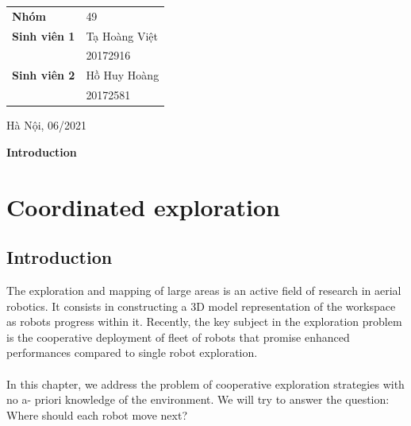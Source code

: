 \documentclass[11pt,openany]{book}
\begin{document}
\begin{titlepage}
\begin{center}
        \vspace{1cm}
        \Large
        \begin{center}
            \begin{tabular}{ l l }
                \textbf{Nhóm}        & 49            \\
                \textbf{Sinh viên 1} & Tạ Hoàng Việt \\
                                     & 20172916      \\
                \textbf{Sinh viên 2} & Hồ Huy Hoàng  \\
                                     & 20172581
            \end{tabular}
        \end{center}
        \vspace{1cm}
        \normalsize
        Hà Nội, 06/2021
    \end{center}
\end{titlepage}
\tableofcontents
\listoffigures
\listoftables
\newpage
\thispagestyle{plain}
\begin{center}
    \Huge
    \textbf{Introduction}
\end{center}
\chapter{Coordinated exploration}
\section{Introduction}
The exploration and mapping of large areas is an active ﬁeld of research in aerial robotics. It consists in constructing a 3D model representation of the workspace as robots progress within it. Recently, the key subject in the exploration problem is the cooperative deployment of ﬂeet of robots that promise enhanced performances compared to single robot exploration.\\\\
In this chapter, we address the problem of cooperative exploration strategies with no a- priori knowledge of the environment. We will try to answer the question: Where should each robot move next?
\end{document}
